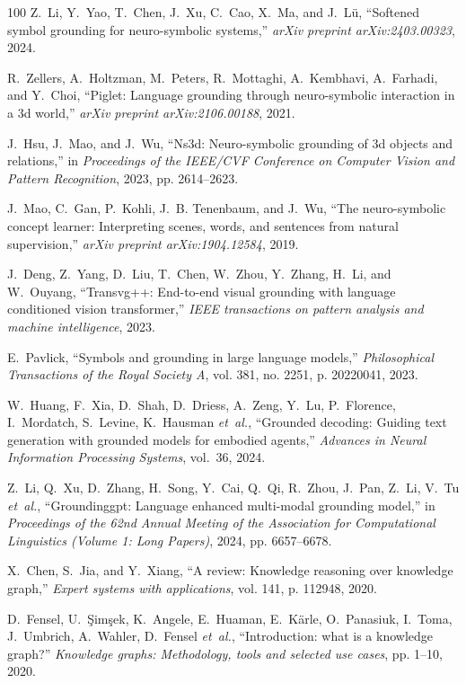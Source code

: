 \documentclass[10pt,journal,compsoc]{IEEEtran}
\begin{document}
\begin{thebibliography}{100}
	Z.~Li, Y.~Yao, T.~Chen, J.~Xu, C.~Cao, X.~Ma, and J.~L{\"u}, ``Softened symbol
	grounding for neuro-symbolic systems,'' \emph{arXiv preprint
		arXiv:2403.00323}, 2024.
	
	R.~Zellers, A.~Holtzman, M.~Peters, R.~Mottaghi, A.~Kembhavi, A.~Farhadi, and
	Y.~Choi, ``Piglet: Language grounding through neuro-symbolic interaction in a
	3d world,'' \emph{arXiv preprint arXiv:2106.00188}, 2021.
	
	J.~Hsu, J.~Mao, and J.~Wu, ``Ns3d: Neuro-symbolic grounding of 3d objects and
	relations,'' in \emph{Proceedings of the IEEE/CVF Conference on Computer
		Vision and Pattern Recognition}, 2023, pp. 2614--2623.
	
	J.~Mao, C.~Gan, P.~Kohli, J.~B. Tenenbaum, and J.~Wu, ``The neuro-symbolic
	concept learner: Interpreting scenes, words, and sentences from natural
	supervision,'' \emph{arXiv preprint arXiv:1904.12584}, 2019.
	
	J.~Deng, Z.~Yang, D.~Liu, T.~Chen, W.~Zhou, Y.~Zhang, H.~Li, and W.~Ouyang,
	``Transvg++: End-to-end visual grounding with language conditioned vision
	transformer,'' \emph{IEEE transactions on pattern analysis and machine
		intelligence}, 2023.
	
	E.~Pavlick, ``Symbols and grounding in large language models,''
	\emph{Philosophical Transactions of the Royal Society A}, vol. 381, no. 2251,
	p. 20220041, 2023.
	
	W.~Huang, F.~Xia, D.~Shah, D.~Driess, A.~Zeng, Y.~Lu, P.~Florence, I.~Mordatch,
	S.~Levine, K.~Hausman \emph{et~al.}, ``Grounded decoding: Guiding text
	generation with grounded models for embodied agents,'' \emph{Advances in
		Neural Information Processing Systems}, vol.~36, 2024.
	
	Z.~Li, Q.~Xu, D.~Zhang, H.~Song, Y.~Cai, Q.~Qi, R.~Zhou, J.~Pan, Z.~Li, V.~Tu
	\emph{et~al.}, ``Groundinggpt: Language enhanced multi-modal grounding
	model,'' in \emph{Proceedings of the 62nd Annual Meeting of the Association
		for Computational Linguistics (Volume 1: Long Papers)}, 2024, pp. 6657--6678.
	
	X.~Chen, S.~Jia, and Y.~Xiang, ``A review: Knowledge reasoning over knowledge
	graph,'' \emph{Expert systems with applications}, vol. 141, p. 112948, 2020.
	
	D.~Fensel, U.~{\c{S}}im{\c{s}}ek, K.~Angele, E.~Huaman, E.~K{\"a}rle,
	O.~Panasiuk, I.~Toma, J.~Umbrich, A.~Wahler, D.~Fensel \emph{et~al.},
	``Introduction: what is a knowledge graph?'' \emph{Knowledge graphs:
		Methodology, tools and selected use cases}, pp. 1--10, 2020.
	

\end{thebibliography}
\end{document}
